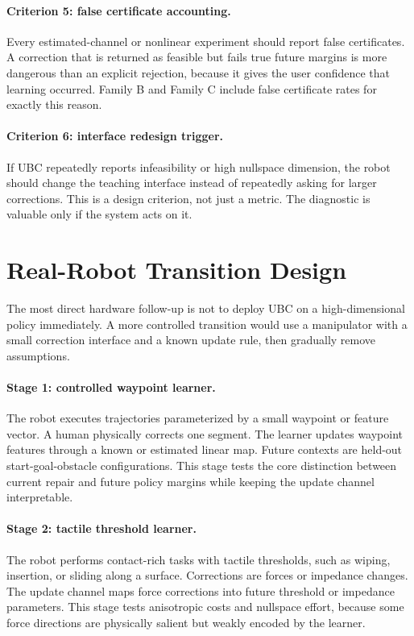 \documentclass{article}
\begin{document}
\paragraph{Criterion 5: false certificate accounting.}
Every estimated-channel or nonlinear experiment should report false
certificates. A correction that is returned as feasible but fails true future
margins is more dangerous than an explicit rejection, because it gives the user
confidence that learning occurred. Family B and Family C include false
certificate rates for exactly this reason.

\paragraph{Criterion 6: interface redesign trigger.}
If UBC repeatedly reports infeasibility or high nullspace dimension, the robot
should change the teaching interface instead of repeatedly asking for larger
corrections. This is a design criterion, not just a metric. The diagnostic is
valuable only if the system acts on it.

\section{Real-Robot Transition Design}

The most direct hardware follow-up is not to deploy UBC on a high-dimensional
policy immediately. A more controlled transition would use a manipulator with a
small correction interface and a known update rule, then gradually remove
assumptions.

\paragraph{Stage 1: controlled waypoint learner.}
The robot executes trajectories parameterized by a small waypoint or feature
vector. A human physically corrects one segment. The learner updates waypoint
features through a known or estimated linear map. Future contexts are held-out
start-goal-obstacle configurations. This stage tests the core distinction
between current repair and future policy margins while keeping the update
channel interpretable.

\paragraph{Stage 2: tactile threshold learner.}
The robot performs contact-rich tasks with tactile thresholds, such as wiping,
insertion, or sliding along a surface. Corrections are forces or impedance
changes. The update channel maps force corrections into future threshold or
impedance parameters. This stage tests anisotropic costs and nullspace effort,
because some force directions are physically salient but weakly encoded by the
learner.
\end{document}
